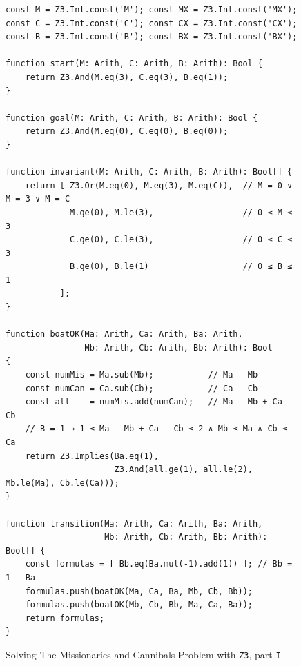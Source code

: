 \begin{figure}[!ht]
\centering
\begin{verbatim}
const M = Z3.Int.const('M'); const MX = Z3.Int.const('MX');
const C = Z3.Int.const('C'); const CX = Z3.Int.const('CX');
const B = Z3.Int.const('B'); const BX = Z3.Int.const('BX');

function start(M: Arith, C: Arith, B: Arith): Bool {
    return Z3.And(M.eq(3), C.eq(3), B.eq(1));
}

function goal(M: Arith, C: Arith, B: Arith): Bool {
    return Z3.And(M.eq(0), C.eq(0), B.eq(0));
}

function invariant(M: Arith, C: Arith, B: Arith): Bool[] {
    return [ Z3.Or(M.eq(0), M.eq(3), M.eq(C)),  // M = 0 ∨ M = 3 ∨ M = C
             M.ge(0), M.le(3),                  // 0 ≤ M ≤ 3 
             C.ge(0), C.le(3),                  // 0 ≤ C ≤ 3 
             B.ge(0), B.le(1)                   // 0 ≤ B ≤ 1 
           ];
}

function boatOK(Ma: Arith, Ca: Arith, Ba: Arith,
                Mb: Arith, Cb: Arith, Bb: Arith): Bool
{
    const numMis = Ma.sub(Mb);           // Ma - Mb
    const numCan = Ca.sub(Cb);           // Ca - Cb
    const all    = numMis.add(numCan);   // Ma - Mb + Ca - Cb
    // B = 1 → 1 ≤ Ma - Mb + Ca - Cb ≤ 2 ∧ Mb ≤ Ma ∧ Cb ≤ Ca
    return Z3.Implies(Ba.eq(1),
                      Z3.And(all.ge(1), all.le(2), Mb.le(Ma), Cb.le(Ca)));
}

function transition(Ma: Arith, Ca: Arith, Ba: Arith,
                    Mb: Arith, Cb: Arith, Bb: Arith): Bool[] { 
    const formulas = [ Bb.eq(Ba.mul(-1).add(1)) ]; // Bb = 1 - Ba
    formulas.push(boatOK(Ma, Ca, Ba, Mb, Cb, Bb));
    formulas.push(boatOK(Mb, Cb, Bb, Ma, Ca, Ba));
    return formulas;
}
\end{verbatim}
\vspace*{-0.3cm}
\caption{Solving The Missionaries-and-Cannibals-Problem with \texttt{Z3}, part \texttt{I}.}
\label{fig:Missionaries-Z3.ipynb-1}
\end{figure}

